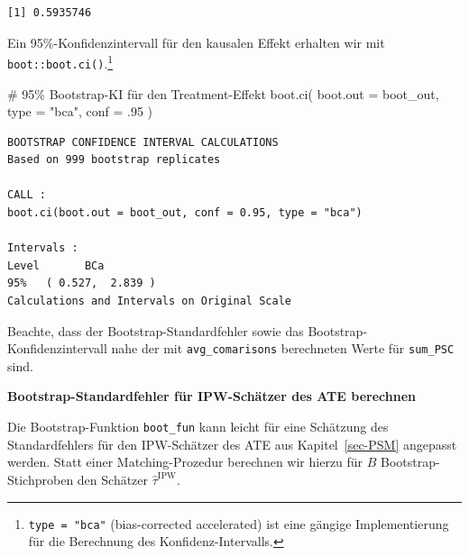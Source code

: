 \documentclass[
  a4paper,
  DIV=11,
  oneside]{scrreprt}
\newenvironment{Shaded}{\begin{snugshade}}{\end{snugshade}}
\newcommand{\AttributeTok}[1]{\textcolor[rgb]{0.40,0.45,0.13}{#1}}
\newcommand{\CommentTok}[1]{\textcolor[rgb]{0.37,0.37,0.37}{#1}}
\newcommand{\DecValTok}[1]{\textcolor[rgb]{0.68,0.00,0.00}{#1}}
\newcommand{\FunctionTok}[1]{\textcolor[rgb]{0.28,0.35,0.67}{#1}}
\newcommand{\NormalTok}[1]{\textcolor[rgb]{0.00,0.23,0.31}{#1}}
\newcommand{\StringTok}[1]{\textcolor[rgb]{0.13,0.47,0.30}{#1}}
\begin{document}
\begin{verbatim}
[1] 0.5935746
\end{verbatim}

Ein 95\%-Konfidenzintervall für den kausalen Effekt erhalten wir mit
\texttt{boot::boot.ci()}.\footnote{\texttt{type\ =\ "bca"}
  (bias-corrected accelerated) ist eine gängige Implementierung für die
  Berechnung des Konfidenz-Intervalls.}

\begin{Shaded}
\begin{Highlighting}[]
\CommentTok{\# 95\% Bootstrap{-}KI für den Treatment{-}Effekt}
\FunctionTok{boot.ci}\NormalTok{(}
  \AttributeTok{boot.out =}\NormalTok{ boot\_out, }
  \AttributeTok{type =} \StringTok{"bca"}\NormalTok{, }
  \AttributeTok{conf =}\NormalTok{ .}\DecValTok{95}
\NormalTok{)}
\end{Highlighting}
\end{Shaded}

\begin{verbatim}
BOOTSTRAP CONFIDENCE INTERVAL CALCULATIONS
Based on 999 bootstrap replicates

CALL : 
boot.ci(boot.out = boot_out, conf = 0.95, type = "bca")

Intervals : 
Level       BCa          
95%   ( 0.527,  2.839 )  
Calculations and Intervals on Original Scale
\end{verbatim}

Beachte, dass der Bootstrap-Standardfehler sowie das
Bootstrap-Konfidenzintervall nahe der mit \texttt{avg\_comarisons}
berechneten Werte für \texttt{sum\_PSC} sind.

\textbf{Bootstrap-Standardfehler für IPW-Schätzer des ATE berechnen}

Die Bootstrap-Funktion \texttt{boot\_fun} kann leicht für eine Schätzung
des Standardfehlers für den IPW-Schätzer des ATE aus
Kapitel~\ref{sec-PSM} angepasst werden. Statt einer Matching-Prozedur
berechnen wir hierzu für \(B\) Bootstrap-Stichproben den Schätzer
\(\widehat{\tau}^\text{IPW}\).
\end{document}
